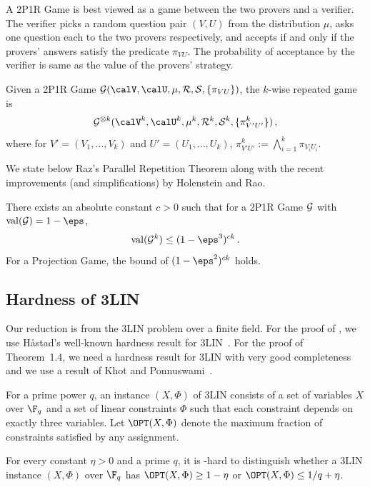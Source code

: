 A 2P1R Game is
best viewed as a game between the two provers and a verifier. The verifier
picks a random question pair $(V,U)$
from the distribution $\mu$, asks one question each to the two provers respectively,
and accepts if and only if the provers' answers satisfy the predicate $\pi_{VU}$.
The probability of acceptance
%
by
the verifier is same as the value of 
%
the
provers' strategy.

\begin{definition} Given a 2P1R Game ${\cal G}(\calV, \calU, \mu, {\cal R}, {\cal S},
\{ \pi_{VU}\} )$, the $k$-wise repeated game is
 \[
{\cal G}^{\otimes k}(\calV^k, \calU^k, \mu^k, {\cal R}^k, {\cal S}^k,
\{ \pi^k_{V'U'}\} )\,,
\] where for $V' = (V_1, \ldots, V_k)$ and $U' =
(U_1,\ldots, U_k)$, $\pi^k_{V'U'} := \bigwedge_{i=1}^k \pi_{V_iU_i}$.
\end{definition}

We state below Raz's Parallel Repetition Theorem along with the recent
improvements (and simplifications) by Holenstein and Rao.
\begin{theorem}\label{thm:pr} 
There exists an absolute constant $c > 0$ such that for a 2P1R
Game ${\cal G}$ with ${\rm val}({\cal G})= 1-\eps$,
 $$ {\rm val}({\cal G}^k) \leq (1-\eps^{3})^{c k}\,. $$
For a Projection Game, the bound of $(1-\eps^{2})^{c k}$ holds.
\end{theorem}

\subsection{Hardness of 3LIN}

Our reduction is from the 3LIN problem over a finite field. For the proof of , we use H\aa stad's well-known hardness result for 3LIN~\cite{Has97}.
For the proof of Theorem~1.4, we need a hardness result for
3LIN with very good completeness and we use a result of Khot and Ponnuswami~\cite{KhotPonnuswami}.

\begin{definition} For a prime power $q$,
an instance $(X, \Phi)$ of 3LIN consists of a set of variables $X$
over $\F_q$ and a set of linear constraints $\Phi$ such that each
constraint depends on exactly three variables. Let $\OPT(X,
\Phi)$ denote the maximum fraction of constraints satisfied by any
assignment.
\end{definition}

\begin{theorem}\label{thm:Has97} 
For every constant $\eta > 0$ and a prime $q$, it is
-hard to distinguish whether a 3LIN instance $(X, \Phi)$ over
$\F_q$ has $\OPT(X,\Phi) \geq 1-\eta$ or $\OPT(X,\Phi)
\leq {1}/{q}+\eta$.
\end{theorem}


